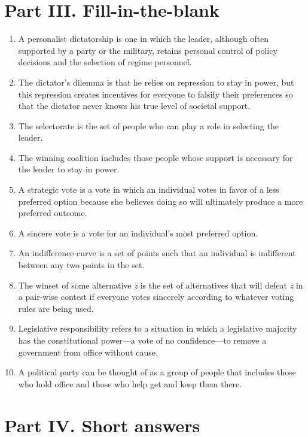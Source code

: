 \documentclass[
]{book}
\begin{document}
\hypertarget{part-iii.-fill-in-the-blank}{%
\section*{Part III. Fill-in-the-blank}\label{part-iii.-fill-in-the-blank}}

\begin{enumerate}
\def\labelenumi{\arabic{enumi}.}
\item
  A personalist dictatorship is one in which the leader, although often supported by a party or the military, retains personal control of policy decisions and the selection of regime personnel.
\item
  The dictator's dilemma is that he relies on repression to stay in power, but this repression creates incentives for everyone to falsify their preferences so that the dictator never knows his true level of societal support.
\item
  The selectorate is the set of people who can play a role in selecting the leader.
\item
  The winning coalition includes those people whose support is necessary for the leader to stay in power.
\item
  A strategic vote is a vote in which an individual votes in favor of a less preferred option because she believes doing so will ultimately produce a more preferred outcome.
\item
  A sincere vote is a vote for an individual's most preferred option.
\item
  An indifference curve is a set of points such that an individual is indifferent between any two points in the set.
\item
  The winset of some alternative \emph{z} is the set of alternatives that will defeat \emph{z} in a pair-wise contest if everyone votes sincerely according to whatever voting rules are being used.
\item
  Legislative responsibility refers to a situation in which a legislative majority has the constitutional power---a vote of no confidence---to remove a government from office without cause.
\item
  A political party can be thought of as a group of people that includes those who hold office and those who help get and keep them there.
\end{enumerate}

\hypertarget{part-iv.-short-answers}{%
\section*{Part IV. Short answers}\label{part-iv.-short-answers}}
\end{document}
